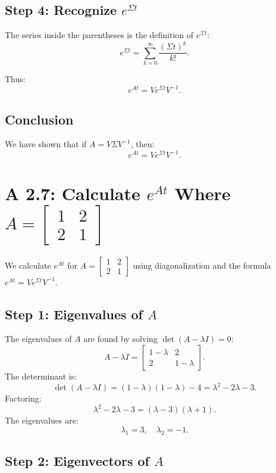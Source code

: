 \documentclass[12pt]{article}
\begin{document}
\subsection*{Step 4: Recognize \(e^{\Sigma t}\)}

The series inside the parentheses is the definition of \(e^{\Sigma t}\):
\[
e^{\Sigma t} = \sum_{k=0}^\infty \frac{(\Sigma t)^k}{k!}.
\]

Thus:
\[
e^{At} = V e^{\Sigma t} V^{-1}.
\]

\subsection*{Conclusion}

We have shown that if \(A = V \Sigma V^{-1}\), then:
\[
e^{At} = V e^{\Sigma t} V^{-1}.
\]

\section*{A 2.7: Calculate \(e^{At}\) Where \(A = \begin{bmatrix} 1 & 2 \\ 2 & 1 \end{bmatrix}\)}

We calculate \(e^{At}\) for \(A = \begin{bmatrix} 1 & 2 \\ 2 & 1 \end{bmatrix}\) using diagonalization and the formula \(e^{At} = V e^{\Sigma t} V^{-1}\).

\subsection*{Step 1: Eigenvalues of \(A\)}

The eigenvalues of \(A\) are found by solving \(\det(A - \lambda I) = 0\):
\[
A - \lambda I = \begin{bmatrix} 1-\lambda & 2 \\ 2 & 1-\lambda \end{bmatrix}.
\]
The determinant is:
\[
\det(A - \lambda I) = (1-\lambda)(1-\lambda) - 4 = \lambda^2 - 2\lambda - 3.
\]
Factoring:
\[
\lambda^2 - 2\lambda - 3 = (\lambda - 3)(\lambda + 1).
\]
The eigenvalues are:
\[
\lambda_1 = 3, \quad \lambda_2 = -1.
\]

\subsection*{Step 2: Eigenvectors of \(A\)}
\end{document}
